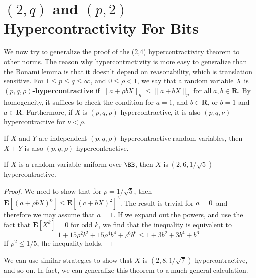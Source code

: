 \section{$(2,q)$ and $(p,2)$ Hypercontractivity For Bits}

We now try to generalize the proof of the (2,4) hypercontractivity theorem to other norms. The reason why hypercontractivity is more easy to generalize than the Bonami lemma is that it doesn't depend on reasonability, which is translation sensitive. For $1 \leq p \leq q \leq \infty$, and $0 \leq \rho < 1$, we say that a random variable $X$ is {\bf $(p,q,\rho)$-hypercontractive} if $\| a + \rho b X \|_q \leq \| a + b X \|_p$ for all $a,b \in \mathbf{R}$. By homogeneity, it suffices to check the condition for $a = 1$, and $b \in \mathbf{R}$, or $b = 1$ and $a \in \mathbf{R}$. Furthermore, if $X$ is $(p,q,\rho)$ hypercontractive, it is also $(p,q,\nu)$ hypercontractive for $\nu < \rho$.

\begin{theorem}
    If $X$ and $Y$ are independent $(p,q,\rho)$ hypercontractive random variables, then $X + Y$ is also $(p,q,\rho)$ hypercontractive.
\end{theorem}

\begin{theorem}
    If $X$ is a random variable uniform over $\BB$, then $X$ is $(2,6,1/\sqrt{5})$ hypercontractive.
\end{theorem}
\begin{proof}
    We need to show that for $\rho = 1/\sqrt{5}$, then $\mathbf{E}[(a + \rho b X)^6] \leq \mathbf{E}[(a + bX)^2]^3$. The result is trivial for $a = 0$, and therefore we may assume that $a = 1$. If we expand out the powers, and use the fact that $\mathbf{E}[X^k] = 0$ for odd $k$, we find that the inequality is equivalent to
    \[ 1 + 15 \rho^2 b^2 + 15 \rho^4 b^4 + \rho^6 b^6 \leq 1 + 3b^2 + 3b^4 + b^6 \]
    If $\rho^2 \leq 1/5$, the inequality holds.
\end{proof}

We can use similar strategies to show that $X$ is $(2,8,1/\sqrt{7})$ hypercontractive, and so on. In fact, we can generalize this theorem to a much general calculation.

